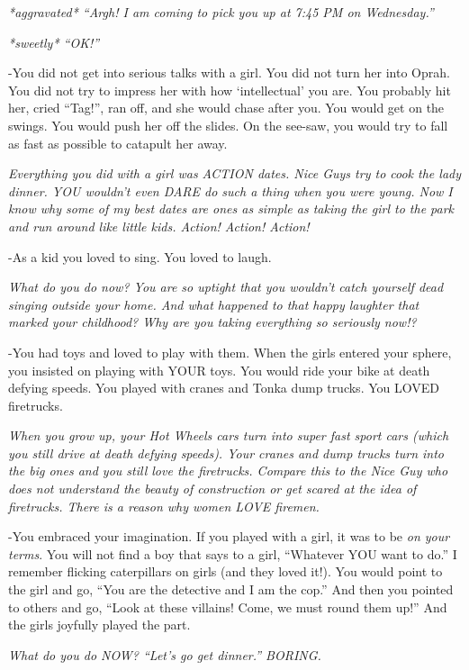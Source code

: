 			\textit{*aggravated* ``Argh! I am coming to pick you up at 7:45 PM on Wednesday.''}
			
			\textit{*sweetly* ``OK!''}
			
			-You did not get into serious talks with a girl. You did not turn her into Oprah. You did not try to impress her with how `intellectual' you are. You probably hit her, cried ``Tag!'', ran off, and she would chase after you. You would get on the swings. You would push her off the slides. On the see-saw, you would try to fall as fast as possible to catapult her away.
			
			\textit{Everything you did with a girl was ACTION dates. Nice Guys try to cook the lady dinner. YOU wouldn't even DARE do such a thing when you were young. Now I know why some of my best dates are ones as simple as taking the girl to the park and run around like little kids. Action! Action! Action!}

			-As a kid you loved to sing. You loved to laugh.

			\textit{What do you do now? You are so uptight that you wouldn't catch yourself dead singing outside your home. And what happened to that happy laughter that marked your childhood? Why are you taking everything so seriously now!?}
			
			-You had toys and loved to play with them. When the girls entered your sphere, you insisted on playing with YOUR toys. You would ride your bike at death defying speeds. You played with cranes and Tonka dump trucks. You LOVED firetrucks.

			\textit{When you grow up, your Hot Wheels cars turn into super fast sport cars (which you still drive at death defying speeds). Your cranes and dump trucks turn into the big ones and you still love the firetrucks. Compare this to the Nice Guy who does not understand the beauty of construction or get scared at the idea of firetrucks. There is a reason why women LOVE firemen.}

			-You embraced your imagination. If you played with a girl, it was to be \textit{on your terms}. You will not find a boy that says to a girl, ``Whatever YOU want to do.'' I remember flicking caterpillars on girls (and they loved it!). You would point to the girl and go, ``You are the detective and I am the cop.'' And then you pointed to others and go, ``Look at these villains! Come, we must round them up!'' And the girls joyfully played the part.

			\textit{What do you do NOW? ``Let's go get dinner.'' BORING.}

